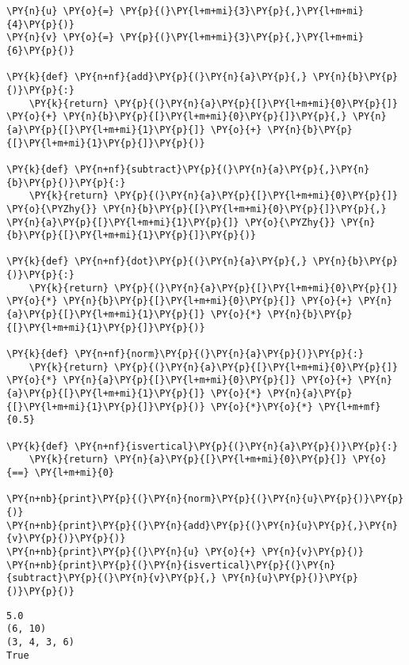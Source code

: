 \begin{Verbatim}[commandchars=\\\{\}]
\PY{n}{u} \PY{o}{=} \PY{p}{(}\PY{l+m+mi}{3}\PY{p}{,}\PY{l+m+mi}{4}\PY{p}{)}
\PY{n}{v} \PY{o}{=} \PY{p}{(}\PY{l+m+mi}{3}\PY{p}{,}\PY{l+m+mi}{6}\PY{p}{)}

\PY{k}{def} \PY{n+nf}{add}\PY{p}{(}\PY{n}{a}\PY{p}{,} \PY{n}{b}\PY{p}{)}\PY{p}{:}
    \PY{k}{return} \PY{p}{(}\PY{n}{a}\PY{p}{[}\PY{l+m+mi}{0}\PY{p}{]} \PY{o}{+} \PY{n}{b}\PY{p}{[}\PY{l+m+mi}{0}\PY{p}{]}\PY{p}{,} \PY{n}{a}\PY{p}{[}\PY{l+m+mi}{1}\PY{p}{]} \PY{o}{+} \PY{n}{b}\PY{p}{[}\PY{l+m+mi}{1}\PY{p}{]}\PY{p}{)}

\PY{k}{def} \PY{n+nf}{subtract}\PY{p}{(}\PY{n}{a}\PY{p}{,}\PY{n}{b}\PY{p}{)}\PY{p}{:}
    \PY{k}{return} \PY{p}{(}\PY{n}{a}\PY{p}{[}\PY{l+m+mi}{0}\PY{p}{]} \PY{o}{\PYZhy{}} \PY{n}{b}\PY{p}{[}\PY{l+m+mi}{0}\PY{p}{]}\PY{p}{,} \PY{n}{a}\PY{p}{[}\PY{l+m+mi}{1}\PY{p}{]} \PY{o}{\PYZhy{}} \PY{n}{b}\PY{p}{[}\PY{l+m+mi}{1}\PY{p}{]}\PY{p}{)}

\PY{k}{def} \PY{n+nf}{dot}\PY{p}{(}\PY{n}{a}\PY{p}{,} \PY{n}{b}\PY{p}{)}\PY{p}{:}
    \PY{k}{return} \PY{p}{(}\PY{n}{a}\PY{p}{[}\PY{l+m+mi}{0}\PY{p}{]} \PY{o}{*} \PY{n}{b}\PY{p}{[}\PY{l+m+mi}{0}\PY{p}{]} \PY{o}{+} \PY{n}{a}\PY{p}{[}\PY{l+m+mi}{1}\PY{p}{]} \PY{o}{*} \PY{n}{b}\PY{p}{[}\PY{l+m+mi}{1}\PY{p}{]}\PY{p}{)}

\PY{k}{def} \PY{n+nf}{norm}\PY{p}{(}\PY{n}{a}\PY{p}{)}\PY{p}{:}
    \PY{k}{return} \PY{p}{(}\PY{n}{a}\PY{p}{[}\PY{l+m+mi}{0}\PY{p}{]} \PY{o}{*} \PY{n}{a}\PY{p}{[}\PY{l+m+mi}{0}\PY{p}{]} \PY{o}{+} \PY{n}{a}\PY{p}{[}\PY{l+m+mi}{1}\PY{p}{]} \PY{o}{*} \PY{n}{a}\PY{p}{[}\PY{l+m+mi}{1}\PY{p}{]}\PY{p}{)} \PY{o}{*}\PY{o}{*} \PY{l+m+mf}{0.5}

\PY{k}{def} \PY{n+nf}{isvertical}\PY{p}{(}\PY{n}{a}\PY{p}{)}\PY{p}{:}
    \PY{k}{return} \PY{n}{a}\PY{p}{[}\PY{l+m+mi}{0}\PY{p}{]} \PY{o}{==} \PY{l+m+mi}{0}

\PY{n+nb}{print}\PY{p}{(}\PY{n}{norm}\PY{p}{(}\PY{n}{u}\PY{p}{)}\PY{p}{)}
\PY{n+nb}{print}\PY{p}{(}\PY{n}{add}\PY{p}{(}\PY{n}{u}\PY{p}{,}\PY{n}{v}\PY{p}{)}\PY{p}{)}
\PY{n+nb}{print}\PY{p}{(}\PY{n}{u} \PY{o}{+} \PY{n}{v}\PY{p}{)}
\PY{n+nb}{print}\PY{p}{(}\PY{n}{isvertical}\PY{p}{(}\PY{n}{subtract}\PY{p}{(}\PY{n}{v}\PY{p}{,} \PY{n}{u}\PY{p}{)}\PY{p}{)}\PY{p}{)}
\end{Verbatim}

\begin{Verbatim}
5.0
(6, 10)
(3, 4, 3, 6)
True
\end{Verbatim}


